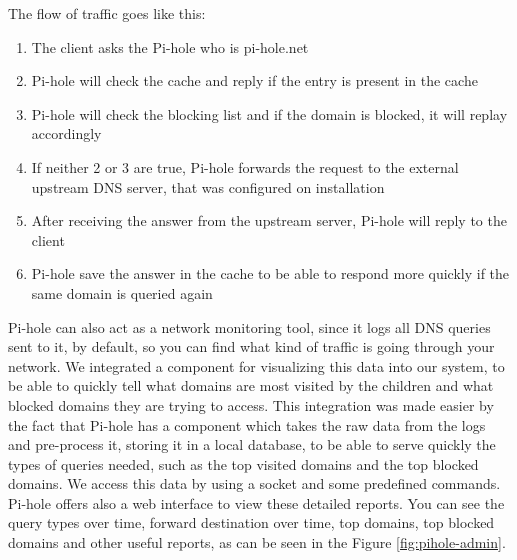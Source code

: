 The flow of traffic goes like this:
\begin{enumerate}
\item The client asks the Pi-hole who is pi-hole.net
\item Pi-hole will check the cache and reply if the entry is present in the cache
\item Pi-hole will check the blocking list and if the domain is blocked, it will replay accordingly
\item If neither 2 or 3 are true, Pi-hole forwards the request to the external upstream DNS server, that was configured on installation
\item After receiving the answer from the upstream server, Pi-hole will reply to the client
\item Pi-hole save the answer in the cache to be able to respond more quickly if the same domain is queried again
\end{enumerate}

Pi-hole can also act as a network monitoring tool, since it logs all DNS queries sent to it, by default, so you can find what kind of traffic is going through your network. We integrated a component for visualizing this data into our system, to be able to quickly tell what domains are most visited by the children and what blocked domains they are trying to access. This integration was made easier by the fact that Pi-hole has a component which takes the raw data from the logs and pre-process it, storing it in a local database, to be able to serve quickly the types of queries needed, such as the top visited domains and the top blocked domains. We access this data by using a socket and some predefined commands. Pi-hole offers also a web interface to view these detailed reports. You can see the query types over time, forward destination over time, top domains, top blocked domains and other useful reports, as can be seen in the Figure \ref{fig:pihole-admin}.

